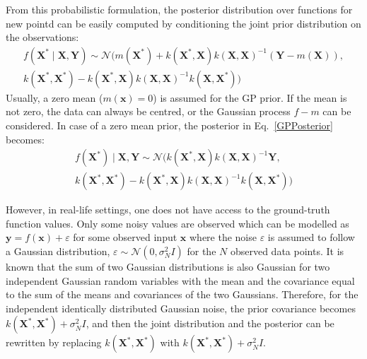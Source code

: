 From this probabilistic formulation, the posterior distribution over functions for new pointd can be easily computed by conditioning the joint prior distribution on the observations:
\begin{equation}\label{GPPosterior}
    \begin{aligned}
        f\left(\mathbf{X^*} \mid \mathbf{X, Y}\right) \sim \mathcal{N}(m\left(\mathbf{X^*}\right)+k\left(\mathbf{X^*}, \mathbf{X}\right) k\left(\mathbf{X}, \mathbf{X}\right)^{-1}\left(\mathbf{Y}-m\left(\mathbf{X}\right)\right),\\
        k\left(\mathbf{X^*}, \mathbf{X^*}\right)-k\left(\mathbf{X^*}, \mathbf{X}\right) k\left(\mathbf{X}, \mathbf{X}\right)^{-1} k\left(\mathbf{X}, \mathbf{X^*}\right))
    \end{aligned}
\end{equation}
Usually, a zero mean ($m(\mathbf{x})=0$) is assumed for the GP prior. If the mean is not zero, the data can always be centred, or the Gaussian process $f-m$ can be considered. In case of a zero mean prior, the posterior in Eq.~\ref{GPPosterior} becomes:
\begin{equation}\label{GPPosterior0}
    \begin{aligned}
        f\left(\mathbf{X^*}\right) \mid \mathbf{X, Y} \sim \mathcal{N}(k\left(\mathbf{X^*}, \mathbf{X}\right) k\left(\mathbf{X}, \mathbf{X}\right)^{-1}\mathbf{Y}, \\
        k\left(\mathbf{X^*}, \mathbf{X^*}\right)-k\left(\mathbf{X^*}, \mathbf{X}\right) k\left(\mathbf{X}, \mathbf{X}\right)^{-1} k\left(\mathbf{X}, \mathbf{X^*}\right))
    \end{aligned}
\end{equation}
\newline

However, in real-life settings, one does not have access to the ground-truth function values. Only some noisy values are observed which can be modelled as $\mathbf{y} = f(\mathbf{x}) + \varepsilon$ for some observed input $\mathbf{x}$ where the noise $\varepsilon$ is assumed to follow a Gaussian distribution, $\varepsilon \sim \mathcal{N}(0, \sigma^2_N I)$ for the $N$ observed data points. It is known that the sum of two Gaussian distributions is also Gaussian for two independent Gaussian random variables with the mean and the covariance equal to the sum of the means and covariances of the two Gaussians. Therefore, for the independent identically distributed Gaussian noise, the prior covariance becomes $k\left(\mathbf{X^*}, \mathbf{X^*}\right) + \sigma^2_N I$, and then the joint distribution and the posterior can be rewritten by replacing $k\left(\mathbf{X^*}, \mathbf{X^*}\right)$  with $k\left(\mathbf{X^*}, \mathbf{X^*}\right) + \sigma^2_N I$.
\newline

